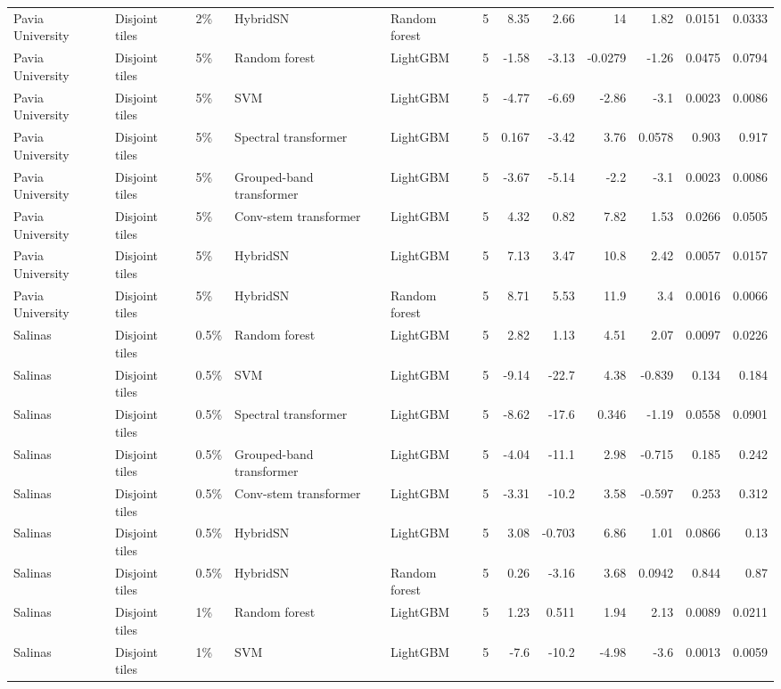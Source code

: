 \begin{table}
\begin{tabular}{lllllrrrrrrr}
Pavia University & Disjoint tiles & 2\% & HybridSN & Random forest & 5 & 8.35 & 2.66 & 14 & 1.82 & 0.0151 & 0.0333 \\
Pavia University & Disjoint tiles & 5\% & Random forest & LightGBM & 5 & -1.58 & -3.13 & -0.0279 & -1.26 & 0.0475 & 0.0794 \\
Pavia University & Disjoint tiles & 5\% & SVM & LightGBM & 5 & -4.77 & -6.69 & -2.86 & -3.1 & 0.0023 & 0.0086 \\
Pavia University & Disjoint tiles & 5\% & Spectral transformer & LightGBM & 5 & 0.167 & -3.42 & 3.76 & 0.0578 & 0.903 & 0.917 \\
Pavia University & Disjoint tiles & 5\% & Grouped-band transformer & LightGBM & 5 & -3.67 & -5.14 & -2.2 & -3.1 & 0.0023 & 0.0086 \\
Pavia University & Disjoint tiles & 5\% & Conv-stem transformer & LightGBM & 5 & 4.32 & 0.82 & 7.82 & 1.53 & 0.0266 & 0.0505 \\
Pavia University & Disjoint tiles & 5\% & HybridSN & LightGBM & 5 & 7.13 & 3.47 & 10.8 & 2.42 & 0.0057 & 0.0157 \\
Pavia University & Disjoint tiles & 5\% & HybridSN & Random forest & 5 & 8.71 & 5.53 & 11.9 & 3.4 & 0.0016 & 0.0066 \\
Salinas & Disjoint tiles & 0.5\% & Random forest & LightGBM & 5 & 2.82 & 1.13 & 4.51 & 2.07 & 0.0097 & 0.0226 \\
Salinas & Disjoint tiles & 0.5\% & SVM & LightGBM & 5 & -9.14 & -22.7 & 4.38 & -0.839 & 0.134 & 0.184 \\
Salinas & Disjoint tiles & 0.5\% & Spectral transformer & LightGBM & 5 & -8.62 & -17.6 & 0.346 & -1.19 & 0.0558 & 0.0901 \\
Salinas & Disjoint tiles & 0.5\% & Grouped-band transformer & LightGBM & 5 & -4.04 & -11.1 & 2.98 & -0.715 & 0.185 & 0.242 \\
Salinas & Disjoint tiles & 0.5\% & Conv-stem transformer & LightGBM & 5 & -3.31 & -10.2 & 3.58 & -0.597 & 0.253 & 0.312 \\
Salinas & Disjoint tiles & 0.5\% & HybridSN & LightGBM & 5 & 3.08 & -0.703 & 6.86 & 1.01 & 0.0866 & 0.13 \\
Salinas & Disjoint tiles & 0.5\% & HybridSN & Random forest & 5 & 0.26 & -3.16 & 3.68 & 0.0942 & 0.844 & 0.87 \\
Salinas & Disjoint tiles & 1\% & Random forest & LightGBM & 5 & 1.23 & 0.511 & 1.94 & 2.13 & 0.0089 & 0.0211 \\
Salinas & Disjoint tiles & 1\% & SVM & LightGBM & 5 & -7.6 & -10.2 & -4.98 & -3.6 & 0.0013 & 0.0059 \\

\end{tabular}
\end{table}
